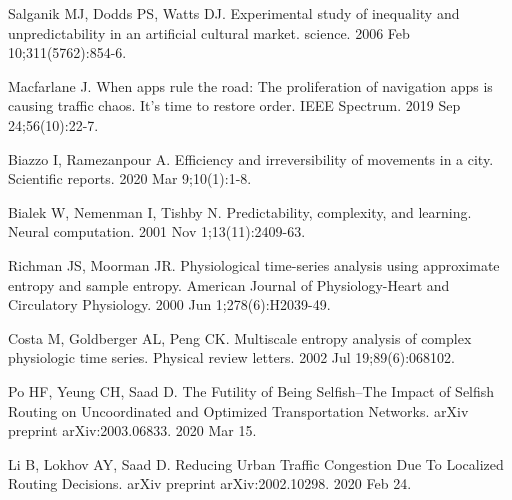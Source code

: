 \documentclass[aps,preprint]{revtex4-1}
\begin{document}
\begin{thebibliography}{prsty}
%
%
%
%
%
%
%
%
%
%



 Salganik MJ, Dodds PS, Watts DJ. Experimental study of inequality and unpredictability in an artificial cultural market. science. 2006 Feb 10;311(5762):854-6.

 Macfarlane J. When apps rule the road: The proliferation of navigation apps is causing traffic chaos. It's time to restore order. IEEE Spectrum. 2019 Sep 24;56(10):22-7.

 Biazzo I, Ramezanpour A. Efficiency and irreversibility of movements in a city. Scientific reports. 2020 Mar 9;10(1):1-8.

 Bialek W, Nemenman I, Tishby N. Predictability, complexity, and learning. Neural computation. 2001 Nov 1;13(11):2409-63.


 Richman JS, Moorman JR. Physiological time-series analysis using approximate entropy and sample entropy. American Journal of Physiology-Heart and Circulatory Physiology. 2000 Jun 1;278(6):H2039-49.

 Costa M, Goldberger AL, Peng CK. Multiscale entropy analysis of complex physiologic time series. Physical review letters. 2002 Jul 19;89(6):068102.




 Po HF, Yeung CH, Saad D. The Futility of Being Selfish--The Impact of Selfish Routing on Uncoordinated and Optimized Transportation Networks. arXiv preprint arXiv:2003.06833. 2020 Mar 15.

 Li B, Lokhov AY, Saad D. Reducing Urban Traffic Congestion Due To Localized Routing Decisions. arXiv preprint arXiv:2002.10298. 2020 Feb 24.





\end{thebibliography}
\end{document}
